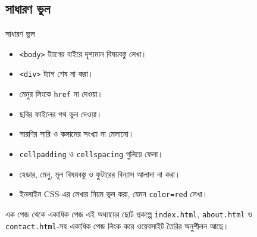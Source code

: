 \subsection{সাধারণ ভুল}

\begin{mistakebox}{সাধারণ ভুল}
\par\noindent
\begin{minipage}[t]{.48\linewidth}\vspace{0pt}
\begin{itemize}
\item \texttt{<body>} ট্যাগের বাইরে দৃশ্যমান বিষয়বস্তু লেখা।
\item \texttt{<div>} ট্যাগ শেষ না করা।
\item মেনুর লিংকে \texttt{href} না দেওয়া।
\item ছবির ফাইলের পথ ভুল দেওয়া।
\end{itemize}
\end{minipage}\hfill
\begin{minipage}[t]{.48\linewidth}\vspace{0pt}
\begin{itemize}
\item সারণির সারি ও কলামের সংখ্যা না মেলানো।
\item \texttt{cellpadding} ও \texttt{cellspacing} গুলিয়ে ফেলা।
\item হেডার, মেনু, মূল বিষয়বস্তু ও ফুটারের বিন্যাস আলাদা না করা।
\item ইনলাইন CSS-এর লেখার নিয়ম ভুল করা, যেমন \texttt{color=red} লেখা।
\end{itemize}
\end{minipage}\par

\end{mistakebox}

\begin{boardbox}{এক পেজ থেকে একাধিক পেজ}
এই অধ্যায়ের ছোট প্রকল্পে \texttt{index.html}, \texttt{about.html} ও \texttt{contact.html}-সহ একাধিক পেজ লিংক করে ওয়েবসাইট তৈরির অনুশীলন আছে।
\end{boardbox}
